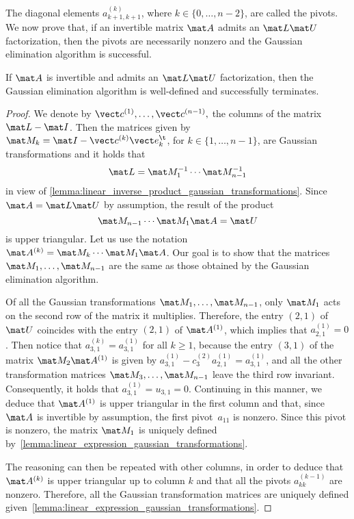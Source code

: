 The diagonal elements $a^{(k)}_{k+1,k+1}$, where $k \in \{0, \dots, n-2 \}$, are called the pivots.
We now prove that,
if an invertible matrix $\mat A$ admits an $\mat L \mat U$ factorization,
then the pivots are necessarily nonzero and the Gaussian elimination algorithm is successful.
\begin{proposition}
    \label{proposition:linear_uniqueness_lu}
    If $\mat A$ is invertible and admits an $\mat L \mat U$  factorization,
    then the Gaussian elimination algorithm is well-defined and successfully terminates.
\end{proposition}
\begin{proof}
    We denote by $\vect c^{(1)}, \dotsc, \vect c^{(n-1)},$ the columns of the matrix $\mat L - \mat I$.
    Then the matrices given by $\mat M_k = \mat I - \vect c^{(k)} \vect e_{k}^\t$,
    for $k \in \{1, \dotsc, n-1 \}$,
    are Gaussian transformations and it holds that
    \[
        \mat L = \mat M_1^{-1} \dotsb  \mat M_{n-1}^{-1}
    \]
    in view of \cref{lemma:linear_inverse_product_gaussian_transformations}.
    Since $\mat A = \mat L \mat U$ by assumption,
    the result of the product
    \[
        \mat M_{n-1} \dotsb \mat M_1 \mat A = \mat U
    \]
    is upper triangular.
    Let us use the notation $\mat A^{(k)} = \mat M_{k} \dotsb \mat M_1 \mat A$.
    Our goal is to show that the matrices~$\mat M_1, \dotsc, \mat M_{n-1}$ are the same as those obtained by the Gaussian elimination algorithm.

    Of all the Gaussian transformations $\mat M_1, \dotsc, \mat M_{n-1}$,
    only $\mat M_1$ acts on the second row of the matrix it multiplies.
    Therefore, the entry $(2, 1)$ of~$\mat U$ coincides with the entry $(2, 1)$ of $\mat A^{(1)}$,
    which implies that $a^{(1)}_{2,1} = 0$.
    Then notice that $a^{(k)}_{3,1} = a^{(1)}_{3, 1}$ for all $k \geq 1$,
    because the entry $(3, 1)$ of the matrix $\mat M_2 \mat A^{(1)}$ is given by $a^{(1)}_{3,1} - c^{(2)}_3 a^{(1)}_{2,1} = a^{(1)}_{3,1}$,
    and all the other transformation matrices $\mat M_3, \dotsc, \mat M_{n-1}$ leave the third row invariant.
    Consequently, it holds that $a^{(1)}_{3,1} = u_{3,1} = 0$.
    Continuing in this manner,
    we deduce that $\mat A^{(1)}$ is upper triangular in the first column and that,
    since $\mat A$ is invertible by assumption,
    the first pivot~$a_{11}$ is nonzero.
    Since this pivot is nonzero,
    the matrix $\mat M_1$ is uniquely defined by~\cref{lemma:linear_expression_gaussian_transformations}.

    The reasoning can then be repeated with other columns,
    in order to deduce that $\mat A^{(k)}$ is upper triangular up to column $k$ and that all the pivots $a^{(k-1)}_{kk}$ are nonzero.
    Therefore, all the Gaussian transformation matrices are uniquely defined given~\cref{lemma:linear_expression_gaussian_transformations}.
\end{proof}


